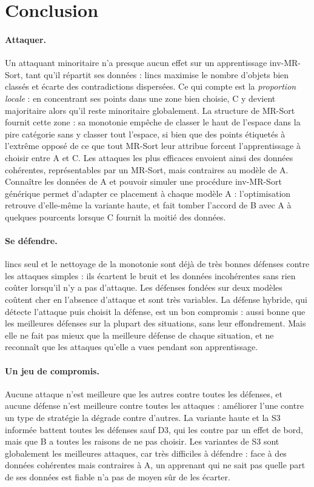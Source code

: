 \documentclass[11pt,a4paper]{article}
\begin{document}
\section*{Conclusion}

\paragraph{Attaquer.} Un attaquant minoritaire n'a presque aucun effet sur un apprentissage inv-MR-Sort, tant qu'il
répartit ses données : lincs maximise le nombre d'objets bien classés et écarte des contradictions dispersées. Ce
qui compte est la \emph{proportion locale} : en concentrant ses points dans une zone bien choisie, C y devient
majoritaire alors qu'il reste minoritaire globalement. La structure de MR-Sort fournit cette zone : sa monotonie
empêche de classer le haut de l'espace dans la pire catégorie sans y classer tout l'espace, si bien que des points
étiquetés à l'extrême opposé de ce que tout MR-Sort leur attribue forcent l'apprentissage à choisir entre A et C. Les
attaques les plus efficaces envoient ainsi des données cohérentes, représentables par un MR-Sort, mais
contraires au modèle de A. Connaître les données de A et pouvoir simuler une procédure inv-MR-Sort générique permet d'adapter ce
placement à chaque modèle A : l'optimisation retrouve d'elle-même la variante haute, et fait tomber l'accord de B
avec A à quelques pourcents lorsque C fournit la moitié des données.

\paragraph{Se défendre.} lincs seul et le nettoyage de la monotonie sont déjà de très bonnes défenses contre les
attaques simples : ils écartent le bruit et les données incohérentes sans rien coûter lorsqu'il n'y a pas
d'attaque. Les défenses fondées sur deux modèles coûtent cher en l'absence d'attaque et sont très variables. La
défense hybride, qui détecte l'attaque puis choisit la défense, est un bon compromis : aussi bonne que les meilleures
défenses sur la plupart des situations, sans leur effondrement. Mais elle ne fait pas mieux que la meilleure
défense de chaque situation, et ne reconnaît que les attaques qu'elle a vues pendant son apprentissage.

\paragraph{Un jeu de compromis.} Aucune attaque n'est meilleure que les autres contre toutes les défenses, et aucune
défense n'est meilleure contre toutes les attaques : améliorer l'une contre un type de stratégie la dégrade contre
d'autres. La variante haute et la S3 informée battent toutes les défenses sauf D3, qui les contre par un effet de
bord, mais que B a toutes les raisons de ne pas choisir. Les variantes de S3 sont globalement les meilleures
attaques, car très difficiles à défendre : face à des données cohérentes mais contraires à A, un apprenant qui ne
sait pas quelle part de ses données est fiable n'a pas de moyen sûr de les écarter.
\end{document}
